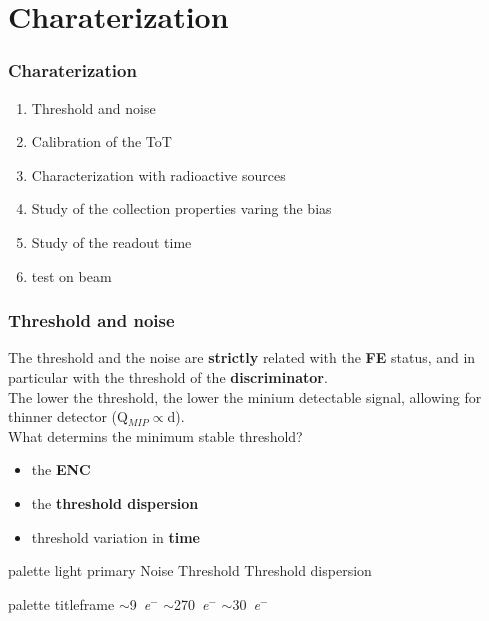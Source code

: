 \section{Charaterization}
    \begin{frame}
        \frametitle{Charaterization}
        \begin{enumerate}
            \item Threshold and noise
            \item Calibration of the ToT
            \item Characterization with radioactive sources
            \item Study of the collection properties varing the bias
            \item Study of the readout time \bigskip\bigskip
            \item test on beam
        \end{enumerate}
   
    \end{frame}


    \begin{frame}
        \frametitle{Threshold and noise}
        The threshold and the noise are \textbf{strictly} related with the \textbf{FE} status, and in particular with the threshold of the \textbf{discriminator}.\\
        \medskip
        The lower the threshold, the lower the minium detectable signal, allowing for thinner detector (Q$_{MIP}\propto$d). \\
        \medskip
        What determins the minimum stable threshold?
        \begin{itemize}
            \item the \textbf{ENC} 
            \item the \textbf{threshold dispersion} 
            \item threshold variation in \textbf{time}
        \end{itemize}
        \medskip
        \begin{center}
        \begin{beamercolorbox}[rounded=true, center]{palette light primary}
            Noise \hspace*{1.2cm} Threshold \hspace*{1.2cm} Threshold dispersion
        \end{beamercolorbox}
        \begin{beamercolorbox}[rounded=true, center]{palette titleframe}
            \hspace*{-2.4cm} $\sim$\SI{9}{\elementarycharge}$^-$ \hspace*{1.4cm} $\sim$\SI{270}{\elementarycharge}$^-$ \hspace*{1.2cm} $\sim$\SI{30}{\elementarycharge}$^-$
        \end{beamercolorbox}
    \end{center}
    \end{frame}


